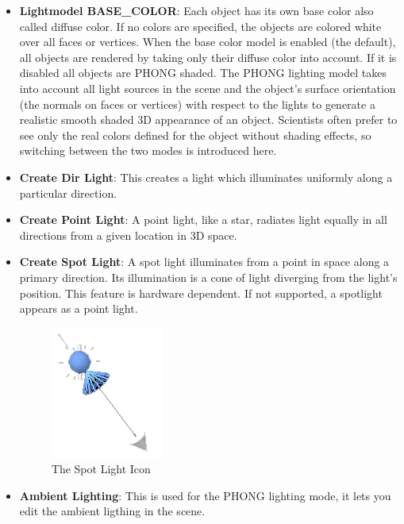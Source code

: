 \begin{itemize}
\item {\bf Lightmodel BASE\_COLOR}: Each object has its own base color also called diffuse color. If no
colors are specified, the objects are colored white over all faces
or vertices. When the base color model is enabled (the default), all
objects are rendered by taking only their diffuse color into account.
If it is disabled all objects are PHONG shaded. The PHONG lighting
model takes into account all light sources in the scene and the object's
surface orientation (the normals on faces or vertices) with respect to
the lights to generate a realistic smooth shaded 3D appearance of an
object. Scientists often prefer to see only the real colors defined
for the object without shading effects, so switching between the two
modes is introduced here.
\item {\bf Create Dir Light}: This creates a light which illuminates uniformly along a particular direction.

\item {\bf Create Point Light}: A point light, like a star, radiates light equally in all directions
from a given location in 3D space.

\item {\bf Create Spot Light}: A spot light illuminates from a point in space along a primary direction.
Its illumination is a cone of light diverging from the light's position.
This feature is hardware dependent. If not supported, a spotlight appears
as a point light.

 \latexonly
 \begin{figure}[htp]
  \begin{center}
   \includegraphics[scale=0.7]{renderer/pict/image23}
   \caption{The Spot Light Icon}
	\label{fig69}
  \end{center}
 \end{figure}
 \endlatexonly

\item {\bf Ambient Lighting}: This is used for the PHONG lighting mode, it lets you edit the ambient
ligthing in the scene.


\end{itemize}
